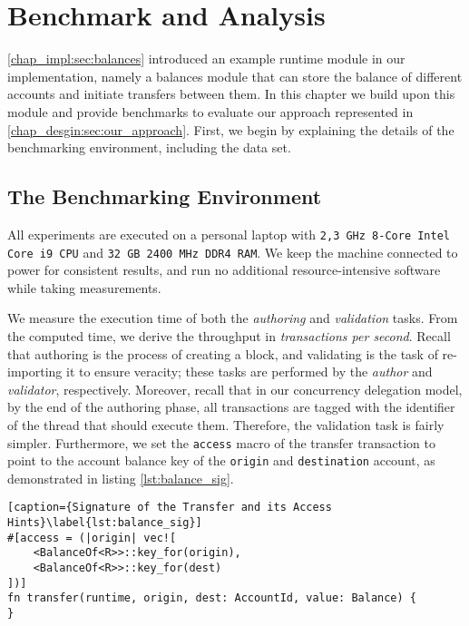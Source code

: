 \chapter{Benchmark and Analysis}  \label{chap:bench_analysis}



\ref{chap_impl:sec:balances} introduced an example runtime module in our implementation, namely a
balances module that can store the balance of different accounts and initiate transfers between
them. In this chapter we build upon this module and provide benchmarks to evaluate our approach
represented in \ref{chap_desgin:sec:our_approach}. First, we begin by explaining the details of the
benchmarking environment, including the data set.

\section{The Benchmarking Environment}

All experiments are executed on a personal laptop with \texttt{2,3 GHz 8-Core Intel Core i9 CPU} and \texttt{32 GB 2400 MHz DDR4
RAM}. We keep the machine connected to power for consistent results, and run no additional
resource-intensive software while taking measurements.

We measure the execution time of both the \textit{authoring} and \textit{validation} tasks. From the
computed time, we derive the throughput in \textit{transactions per second}. Recall that authoring
is the process of creating a block, and validating is the task of re-importing it to ensure veracity; these tasks 
are performed by the \textit{author} and \textit{validator}, respectively. Moreover, recall that in our
concurrency delegation model, by the end of the authoring phase, all transactions are tagged with the
identifier of the thread that should execute them. Therefore, the validation task is fairly simpler.
Furthermore, we set the \texttt{access} macro of the transfer transaction to point to the account
balance key of the \texttt{origin} and \texttt{destination} account, as demonstrated in listing
\ref{lst:balance_sig}.

\begin{lstlisting}[caption={Signature of the Transfer and its Access Hints}\label{lst:balance_sig}]
#[access = (|origin| vec![
	<BalanceOf<R>>::key_for(origin),
	<BalanceOf<R>>::key_for(dest)
])]
fn transfer(runtime, origin, dest: AccountId, value: Balance) {
}
\end{lstlisting}

